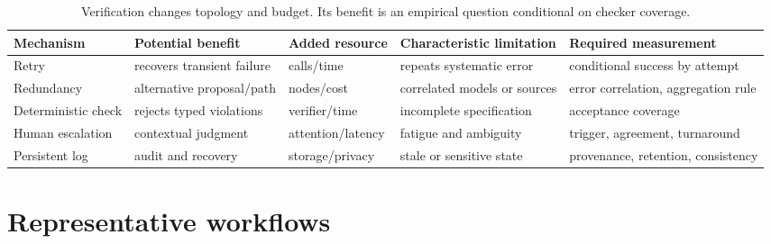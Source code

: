 \documentclass[10pt]{article}
\begin{document}
\begin{table}[H]
\centering\small
\begin{tabularx}{\linewidth}{>{\raggedright\arraybackslash}p{.18\linewidth}YYYY}
\toprule
Mechanism & Potential benefit & Added resource & Characteristic limitation & Required measurement\\
\midrule
Retry & recovers transient failure & calls/time & repeats systematic error & conditional success by attempt\\
Redundancy & alternative proposal/path & nodes/cost & correlated models or sources & error correlation, aggregation rule\\
Deterministic check & rejects typed violations & verifier/time & incomplete specification & acceptance coverage\\
Human escalation & contextual judgment & attention/latency & fatigue and ambiguity & trigger, agreement, turnaround\\
Persistent log & audit and recovery & storage/privacy & stale or sensitive state & provenance, retention, consistency\\
\bottomrule
\end{tabularx}
\caption{Verification changes topology and budget. Its benefit is an empirical question conditional on checker coverage.}
\label{tab:verification}
\end{table}

\section{Representative workflows}
\end{document}
